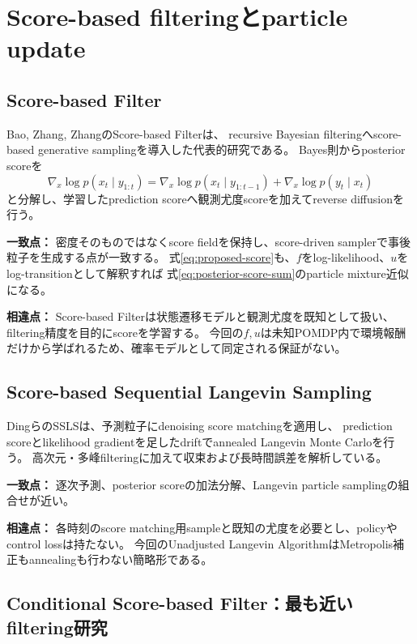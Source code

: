 \documentclass[a4paper,11pt]{article}
\newcommand{\matchpoint}{\par\noindent\textbf{一致点：}}
\newcommand{\difference}{\par\noindent\textbf{相違点：}}
\begin{document}
\section{Score-based filteringとparticle update}

\subsection{Score-based Filter}

Bao, Zhang, ZhangのScore-based Filter\cite{bao2024scorefilter}は、
recursive Bayesian filteringへscore-based generative samplingを導入した代表的研究である。
Bayes則からposterior scoreを
\begin{equation}
  \nabla_x\log p(x_t\mid y_{1:t})
  =\nabla_x\log p(x_t\mid y_{1:t-1})
   +\nabla_x\log p(y_t\mid x_t)
  \label{eq:posterior-score-sum}
\end{equation}
と分解し、学習したprediction scoreへ観測尤度scoreを加えてreverse diffusionを行う。

\matchpoint
密度そのものではなくscore fieldを保持し、score-driven samplerで事後粒子を生成する点が一致する。
式\eqref{eq:proposed-score}も、$f$をlog-likelihood、$u$をlog-transitionとして解釈すれば
式\eqref{eq:posterior-score-sum}のparticle mixture近似になる。

\difference
Score-based Filterは状態遷移モデルと観測尤度を既知として扱い、filtering精度を目的にscoreを学習する。
今回の$f,u$は未知POMDP内で環境報酬だけから学ばれるため、確率モデルとして同定される保証がない。

\subsection{Score-based Sequential Langevin Sampling}

DingらのSSLS\cite{ding2024ssls}は、予測粒子にdenoising score matchingを適用し、
prediction scoreとlikelihood gradientを足したdriftでannealed Langevin Monte Carloを行う。
高次元・多峰filteringに加えて収束および長時間誤差を解析している。

\matchpoint
逐次予測、posterior scoreの加法分解、Langevin particle samplingの組合せが近い。

\difference
各時刻のscore matching用sampleと既知の尤度を必要とし、policyやcontrol lossは持たない。
今回のUnadjusted Langevin AlgorithmはMetropolis補正もannealingも行わない簡略形である。

\subsection{Conditional Score-based Filter：最も近いfiltering研究}
\end{document}
